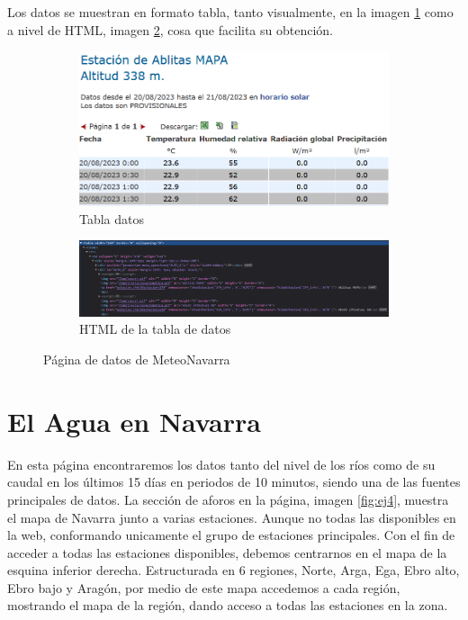 Los datos se muestran en formato tabla, tanto visualmente, en la imagen \ref{fig:sub7} como a nivel de HTML, imagen \ref{fig:sub8}, cosa que facilita su obtención.

\begin{figure} [H]
	\centering
	\begin{subfigure}{.5\textwidth}
		\centering
		\includegraphics[width=.7\linewidth]{fig/MeteoNavarraData.png}
		\caption{Tabla datos}
		\label{fig:sub7}
	\end{subfigure}%
	\begin{subfigure}{.5\textwidth}
		\centering
		\includegraphics[width=.7\linewidth]{fig/MeteoNavarraCodeHTML.png}
		\caption{HTML de la tabla de datos}
		\label{fig:sub8}
	\end{subfigure}
	\caption{Página de datos de MeteoNavarra}
	\label{fig:ej29}
\end{figure}

\section{El Agua en Navarra}
En esta página encontraremos los datos tanto del nivel de los ríos como de su caudal en los últimos 15 días en periodos de 10 minutos, siendo una de las fuentes principales de datos.
\newline
\newline
La sección de aforos en la página, imagen \ref{fig:ej4}, muestra el mapa de Navarra junto a varias estaciones. Aunque no todas las disponibles en la web, conformando unicamente el grupo de estaciones principales.\newline
\newline
Con el fin de acceder a todas las estaciones disponibles, debemos centrarnos en el mapa de la esquina inferior derecha. Estructurada en 6 regiones, Norte, Arga, Ega, Ebro alto, Ebro bajo y Aragón, por medio de este mapa accedemos a cada región, mostrando el mapa de la región, dando acceso a todas las estaciones en la zona.

